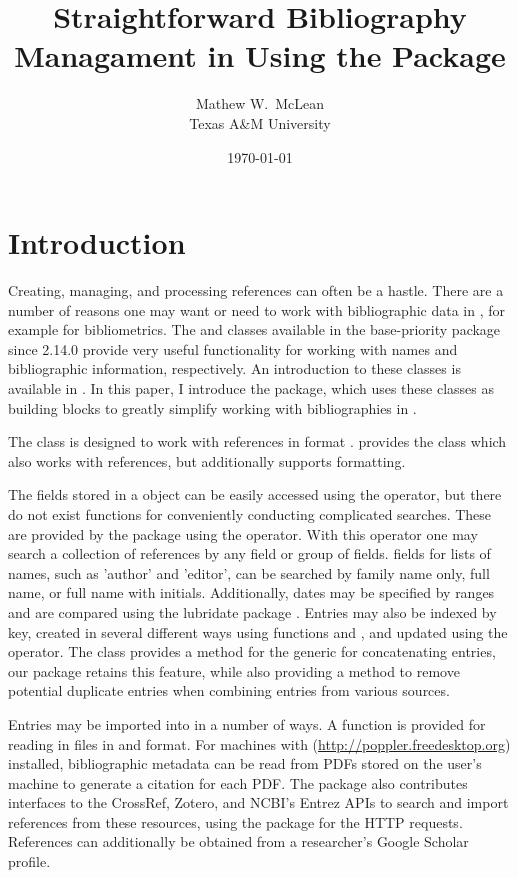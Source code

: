\documentclass[article]{jss}\usepackage[]{graphicx}\usepackage[]{color}
\title{Straightforward Bibliography Managament in \R{} Using the \ourpkg{} Package}
\author{Mathew W.\ McLean\\ Texas A\&M University}
\date{\today}
\newcommand{\ourpkg}{\pkg{RefManageR}}
\newcommand{\bt}{\`{}}
\begin{document}
\maketitle
\section{Introduction}
Creating, managing, and processing references can often be a hastle.  There are a number of reasons one may want or need to work with bibliographic data in \R{} \citep{R}, for example for bibliometrics.  The  and  classes available in the base-priority  package since \R{} 2.14.0 provide very useful functionality for working with names and bibliographic information, respectively.  An introduction to these classes is available in \citet{hornik2012who}.  In this paper, I introduce the \ourpkg{} package, which uses these classes as building blocks to greatly simplify working with bibliographies in \R{}.

The  class is designed to work with references in \Bibtex{} format \citep{bibtex}.  \ourpkg{} provides the  class which also works with \Bibtex{} references, but additionally supports \Biblatex{} formatting.  

The \Bibtex{} fields stored in a  object can be easily accessed using the \code{\bt$\bt} operator, but there do not exist functions for conveniently conducting complicated searches.  These are provided by the \ourpkg{} package using the \code{\bt[\bt} operator.  With this operator one may search a collection of references by any field or group of fields.  \Biblatex{} fields for lists of names, such as 'author' and 'editor', can be searched by family name only, full name, or full name with initials.  Additionally, dates may be specified by ranges and are compared using the lubridate package \citep{lubridate}.  Entries may also be indexed by key, created in several different ways using functions  and , and updated using the \code{\bt[<-\bt} operator.  The  class provides a method for the  generic for concatenating entries, our package retains this feature, while also providing a  method to remove potential duplicate entries when combining entries from various sources.

Entries may be imported into \R{} in a number of ways.  A function is provided for reading in  files in \Biblatex{} and \Bibtex{} format.  For machines with  (\url{http://poppler.freedesktop.org}) installed, bibliographic metadata can be read from PDFs stored on the user's machine to generate a citation for each PDF.  The package also contributes interfaces to the CrossRef, Zotero, and NCBI's Entrez APIs to search and import references from these resources, using the  package \citep{rcurl} for the HTTP requests.  References can additionally be obtained from a researcher's Google Scholar profile.
\end{document}

